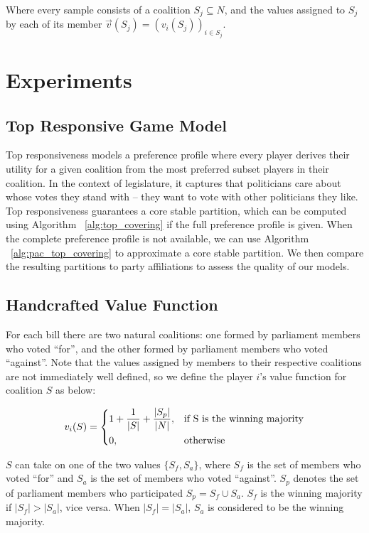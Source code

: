 \documentclass[letterpaper]{article} %
\begin{document}
Where every sample consists of a coalition $S_j \subseteq N$, and the values assigned to $S_j$ by each of its member $\vec{v}(S_j) = (v_i(S_j))_{i \in S_j}$.

\section{Experiments}

\subsection{Top Responsive Game Model}
Top responsiveness models a preference profile where every player derives their utility for a given coalition from the most preferred subset players in their coalition. In the context of legislature, it captures that politicians care about whose votes they stand with – they want to vote with other politicians they like. Top responsiveness guarantees a core stable partition, which can be computed using Algorithm ~\ref{alg:top_covering} if the full preference profile is given. When the complete preference profile is not available, we can use Algorithm ~\ref{alg:pac_top_covering} to approximate a core stable partition. We then compare the resulting partitions to party affiliations to assess the quality of our models.

\subsection{Handcrafted Value Function}
For each bill there are two natural coalitions: one formed by parliament members who voted ``for'', and the other formed by parliament members who voted ``against''. Note that the values assigned by members to their respective coalitions are not immediately well defined, so we define the player $i$'s value function for coalition $S$ as below:

\[
  v_i(S) = 
  \begin{dcases}
      1 + \frac{1}{|S|} + \frac{|S_p|}{|N|},& \text{if S is the winning majority}\\
      0,              & \text{otherwise}
  \end{dcases}
\]

$S$ can take on one of the two values $\{S_f, S_a\}$, where $S_f$ is the set of members who voted ``for'' and $S_a$ is the set of members who voted ``against''. $S_p$ denotes the set of parliament members who participated $S_p = S_f \cup S_a$. $S_f$ is the winning majority if $|S_f| > |S_a|$, vice versa. When $|S_f| = |S_a|$, $S_a$ is considered to be the winning majority.
\end{document}
